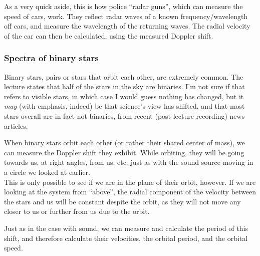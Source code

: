 As a very quick aside, this is how police ``radar guns'', which can measure the speed of cars, work. They reflect radar waves of a known frequency/wavelength off cars, and measure the wavelength of the returning waves. The radial velocity of the car can then be calculated, using the measured Doppler shift.

\subsubsection{Spectra of binary stars}

Binary stars, pairs or stars that orbit each other, are extremely common. The lecture states that half of the stars in the sky are binaries. I'm not sure if that refers to visible stars, in which case I would guess nothing has changed, but it \emph{may} (with emphasis, indeed) be that science's view has shifted, and that most stars overall are in fact not binaries, from recent (post-lecture recording) news articles.

When binary stars orbit each other (or rather their shared center of mass), we can measure the Doppler shift they exhibit. While orbiting, they will be going towards us, at right angles, from us, etc. just as with the sound source moving in a circle we looked at earlier.\\
This is only possible to see if we are in the plane of their orbit, however. If we are looking at the system from ``above'', the radial component of the velocity between the stars and us will be constant despite the orbit, as they will not move any closer to us or further from us due to the orbit.

Just as in the case with sound, we can measure and calculate the period of this shift, and therefore calculate their velocities, the orbital period, and the orbital speed.

